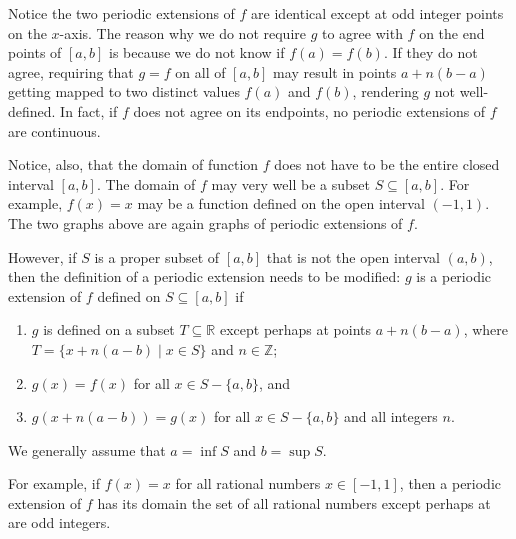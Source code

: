 \documentclass[12pt]{article}
\begin{document}
Notice the two periodic extensions of $f$ are identical except at odd integer points on the $x$-axis.  The reason why we do not require $g$ to agree with $f$ on the end points of $[a,b]$ is because we do not know if $f(a)=f(b)$.  If they do not agree, requiring that $g=f$ on all of $[a,b]$ may result in points $a+n(b-a)$ getting mapped to two distinct values $f(a)$ and $f(b)$, rendering $g$ not well-defined.  In fact, if $f$ does not agree on its endpoints, no periodic extensions of $f$ are continuous.

Notice, also, that the domain of function $f$ does not have to be the entire closed interval $[a,b]$.  The domain of $f$ may very well be a subset $S\subseteq [a,b]$.  For example, $f(x)=x$ may be a function defined on the open interval $(-1,1)$.  The two graphs above are again graphs of periodic extensions of $f$.  

However, if $S$ is a proper subset of $[a,b]$ that is not the open interval $(a,b)$, then the definition of a periodic extension needs to be modified: $g$ is a periodic extension of $f$ defined on $S\subseteq [a,b]$ if 
\begin{enumerate}
\item $g$ is defined on a subset $T\subseteq \mathbb{R}$ except perhaps at points $a+n(b-a)$, where $T=\lbrace x+n(a-b)\mid x\in S\rbrace$ and $n\in\mathbb{Z}$;
\item $g(x)=f(x)$ for all $x\in S-\lbrace a,b\rbrace$, and
\item $g(x+n(a-b))=g(x)$ for all $x\in S-\lbrace a,b\rbrace$ and all integers $n$.
\end{enumerate}
We generally assume that $a=\inf S$ and $b=\sup S$.

For example, if $f(x)=x$ for all rational numbers $x\in [-1,1]$, then a periodic extension of $f$ has its domain the set of all rational numbers except perhaps at are odd integers.
\end{document}

